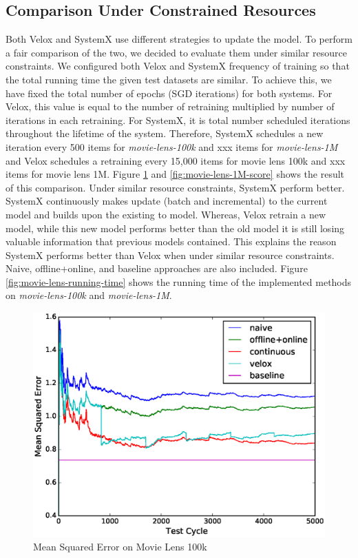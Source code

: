 \documentclass{sig-alternate-05-2015}
\begin{document}
\subsection{Comparison Under Constrained Resources }
Both Velox and SystemX use different strategies to update the model.
To perform a fair comparison of the two, we decided to evaluate them under similar resource constraints.
We configured both Velox and SystemX frequency of training so that the total running time the given test datasets are similar.
To achieve this, we have fixed the total number of epochs (SGD iterations) for both systems.
For Velox, this value is equal to the number of retraining multiplied by number of iterations in each retraining. 
For SystemX, it is total number scheduled iterations throughout the lifetime of the system.
Therefore, SystemX schedules a new iteration every 500 items for \textit{movie-lens-100k} and xxx items for \textit{movie-lens-1M} and Velox schedules a retraining every 15,000 items for movie lens 100k and xxx items for movie lens 1M.
Figure \ref{fig:movie-lens-100k-score} and \ref{fig:movie-lens-1M-score} shows the result of this comparison.
Under similar resource constraints, SystemX perform better.
SystemX continuously makes update (batch and incremental) to the current model and builds upon the existing to model.
Whereas, Velox retrain a new model, while this new model performs better than the old model it is still losing valuable information that previous models contained.
This explains the reason SystemX performs better than Velox when under similar resource constraints.
Naive, offline+online, and baseline approaches are also included.
Figure \ref{fig:movie-lens-running-time} shows the running time of the implemented methods on \textit{movie-lens-100k} and \textit{movie-lens-1M}.

\begin{figure}[!ht]
\centering
\includegraphics[width=\columnwidth]{../images/experiment-results/movie-lens-100k-quality.eps}
\caption{Mean Squared Error on Movie Lens 100k}
\label{fig:movie-lens-100k-score}
\end{figure}
\end{document}
